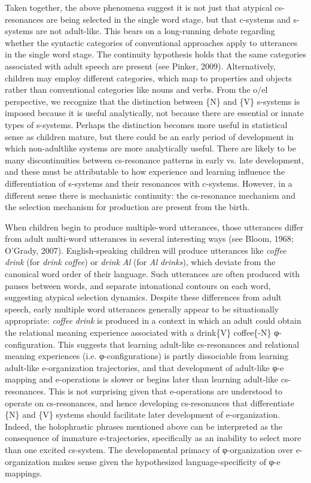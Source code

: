 Taken together, the above phenomena suggest it is not just that atypical cs-resonances are being selected in the single word stage, but that c-systems and s-systems are not adult-like. This bears on a long-running debate regarding whether the syntactic categories of conventional approaches apply to utterances in the single word stage. The continuity hypothesis holds that the same categories associated with adult speech are present (see Pinker, 2009). Alternatively, children may employ different categories, which map to properties and objects rather than conventional categories like nouns and verbs. From the o/el perspective, we recognize that the distinction between \{N\} and \{V\} s-systems is imposed because it is useful analytically, not because there are essential or innate types of s-systems. Perhaps the distinction becomes more useful in statistical sense as children mature, but there could be an early period of development in which non-adultlike systems are more analytically useful. There are likely to be many discontinuities between cs-resonance patterns in early vs. late development, and these must be attributable to how experience and learning influence the differentiation of s-systems and their resonances with c-systems. However, in a different sense there is mechanistic continuity: the cs-resonance mechanism and the selection mechanism for production are present from the birth.

When children begin to produce multiple-word utterances, those utterances differ from adult multi-word utterances in several interesting ways (see Bloom, 1968; O’Grady, 2007). English-speaking children will produce utterances like \textit{coffee} \textit{drink} (for \textit{drink} \textit{coffee}) or \textit{drink} \textit{Al} (for \textit{Al} \textit{drinks}), which deviate from the canonical word order of their language. Such utterances are often produced with pauses between words, and separate intonational contours on each word, suggesting atypical selection dynamics. Despite these differences from adult speech, early multiple word utterances generally appear to be situationally appropriate: \textit{coffee} \textit{drink} is produced in a context in which an adult could obtain the relational meaning experience associated with a {\textbar}drink\{V\} coffee\{-N\}{\textbar} φ{}-configuration. This suggests that learning adult-like cs-resonances and relational meaning experiences (i.e. φ{}-configurations) is partly dissociable from learning adult-like e-organization trajectories, and that development of adult-like φ{}-e mapping and e-operations is slower or begins later than learning adult-like cs-resonances. This is not surprising given that e-operations are understood to operate on cs-resonances, and hence developing cs-resonances that differentiate \{N\} and \{V\} systems should facilitate later development of e-organization. Indeed, the holophrastic phrases mentioned above can be interpreted as the consequence of immature e-trajectories, specifically as an inability to select more than one excited cs-system. The developmental primacy of φ{}-organization over e-organization makes sense given the hypothesized language-specificity of φ{}-e mappings.

